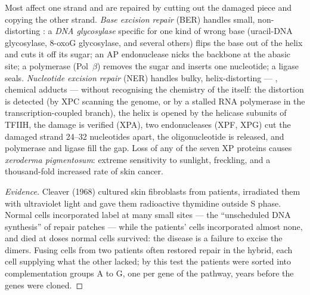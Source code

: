 \begin{definition}\label{def:b3:dna-repair:excision}
Most  affect one strand and are repaired by cutting out the
damaged piece and copying the other strand. \emph{Base excision repair}
(BER) handles small, non-distorting : a \emph{DNA glycosylase}
specific for one kind of wrong base (uracil-DNA glycosylase, 8-oxoG
glycosylase, and several others) flips the base out of the helix and
cuts it off its sugar; an AP endonuclease nicks the backbone at the
abasic site; a polymerase (Pol~$\beta$) removes the sugar and inserts
one nucleotide; a ligase seals. \emph{Nucleotide excision repair}
(NER) handles bulky, helix-distorting  --- ,
chemical adducts --- without recognising the chemistry of the 
itself: the distortion is detected (by XPC scanning the genome, or by
a stalled RNA polymerase in the transcription-coupled branch), the
helix is opened by the helicase subunits of TFIIH, the damage is
verified (XPA), two endonucleases (XPF, XPG) cut the damaged strand
\numrange{24}{32} nucleotides apart, the oligonucleotide is released,
and polymerase and ligase fill the gap. Loss of any of the seven
XP proteins causes \emph{xeroderma pigmentosum}: extreme sensitivity to
sunlight, freckling, and a thousand-fold increased rate of skin
cancer.
\end{definition}

\begin{proof}[Evidence]
Cleaver (1968) cultured skin fibroblasts from 
patients, irradiated them with ultraviolet light and gave them
radioactive thymidine outside S phase. Normal cells incorporated
label at many small sites --- the ``unscheduled DNA synthesis'' of
repair patches --- while the patients' cells incorporated almost none,
and died at doses normal cells survived: the disease is a failure to
excise the dimers. Fusing cells from two patients often restored
repair in the hybrid, each cell supplying what the other lacked; by
this test the patients were sorted into complementation groups A to
G, one per gene of the pathway, years before the genes were cloned.
\end{proof}

